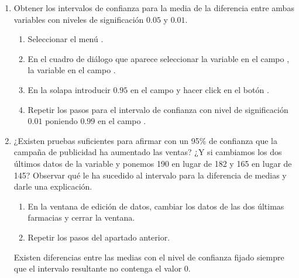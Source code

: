 \begin{enumerate}[leftmargin=*]
\begin{enumerate}
\item Obtener los intervalos de confianza para la media de la diferencia entre ambas variables con niveles de significación $0.05$ y $0.01$.
\begin{indicacion}
\begin{enumerate}
\item Seleccionar el menú .
\item En el cuadro de diálogo que aparece seleccionar la variable  en el campo , la variable
 en el campo .
\item En la solapa  introducir $0.95$ en el campo  y hacer click en el botón
.
\item Repetir los pasos para el intervalo de confianza con nivel de significación $0.01$ poniendo $0.99$ en el campo .
\end{enumerate}
\end{indicacion}

\item ¿Existen pruebas suficientes para afirmar con un 95\% de confianza que la campaña de publicidad ha aumentado las
ventas? ¿Y si cambiamos los dos últimos datos de la variable  y ponemos 190 en lugar de 182 y 165 en
lugar de 145? Observar qué le ha sucedido al intervalo para la diferencia de medias y darle una explicación.
\begin{indicacion}
\begin{enumerate}
\item En la ventana de edición de datos, cambiar los datos de las dos últimas farmacias y cerrar la ventana.
\item Repetir los pasos del apartado anterior.
\end{enumerate}
Existen diferencias entre las medias con el nivel de confianza fijado siempre que el intervalo resultante no contenga el valor 0.
\end{indicacion}
\end{enumerate}



\end{enumerate}
